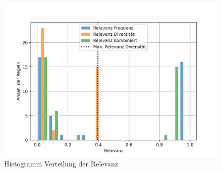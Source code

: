 \begin{figure}[htbp]
  \centering
  \includegraphics[width=1\linewidth]{img/priodistrhist.png}
  \caption{Histogramm Verteilung der Relevanz}
  \label{fig:priodistrhist}
\end{figure}

